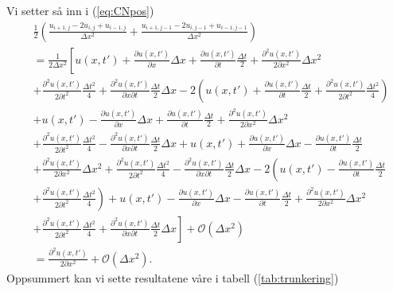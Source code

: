 \documentclass[norsk, 10pt]{article}
\begin{document}
Vi setter så inn i (\ref{eq:CNpos})
\begin{align*}
&\frac{1}{2}\left(\frac{u_{i+1,j}-2u_{i,j}+u_{i-1,j}}{\Delta x^2}+\frac{u_{i+1,j-1}-2u_{i,j-1}+u_{i-1,j-1}}{\Delta x^2} \right) \\
&= \frac 1{2\Delta x^2}\left[u(x,t')+\frac{\partial u(x,t')}{\partial x}\Delta x+\frac{\partial u(x,t')}{\partial t} \frac{\Delta t}{2} +\frac{\partial^2 u(x,t')}{2\partial x^2}\Delta x^2\right.\nonumber \\ 
&+\frac{\partial^2 u(x,t')}{2\partial t^2}\frac{\Delta t^2}{4} +\frac{\partial^2 u(x,t')}{\partial x\partial t}\frac{\Delta t}{2} \Delta x - 2\left(  u(x,t')+\frac{\partial u(x,t')}{\partial t}\frac{\Delta t}{2} +\frac{\partial ^2 u(x,t')}{2\partial t^2}\frac{\Delta t^2}{4} \right) \\
&+ u(x,t')-\frac{\partial u(x,t')}{\partial x}\Delta x+\frac{\partial u(x,t')}{\partial t} \frac{\Delta t}{2} +\frac{\partial^2 u(x,t')}{2\partial x^2}\Delta x^2\\  \nonumber
&+\frac{\partial^2 u(x,t')}{2\partial t^2}\frac{\Delta t^2}{4} -\frac{\partial^2 u(x,t')}{\partial x\partial t}\frac{\Delta t}{2} \Delta x + u(x,t')+\frac{\partial u(x,t')}{\partial x}\Delta x-\frac{\partial u(x,t')}{\partial t} \frac{\Delta t}{2} \\
&+\frac{\partial^2 u(x,t')}{2\partial x^2}\Delta x^2+\frac{\partial^2 u(x,t')}{2\partial t^2}\frac{\Delta t^2}{4} -\frac{\partial^2 u(x,t')}{\partial x\partial t}\frac{\Delta t}{2} \Delta x -2\left(u(x,t')-\frac{\partial u(x,t')}{\partial t}\frac{\Delta t}{2}\right.\\
&\left.+\frac{\partial ^2 u(x,t')}{2\partial t^2}\frac{\Delta t^2}{4} \right)+u(x,t')-\frac{\partial u(x,t')}{\partial x}\Delta x-\frac{\partial u(x,t')}{\partial t} \frac{\Delta t}{2} +\frac{\partial^2 u(x,t')}{2\partial x^2}\Delta x^2 \\  \nonumber
&\left.+\frac{\partial^2 u(x,t')}{2\partial t^2}\frac{\Delta t^2}{4} +\frac{\partial^2 u(x,t')}{\partial x\partial t}\frac{\Delta t}{2} \Delta x\right] + \mathcal O(\Delta x^2) \\
&= \frac{\partial^2 u(x,t')}{2\partial x^2} + \mathcal O(\Delta x^2).
\end{align*}
Oppsummert kan vi sette resultatene våre i tabell (\ref{tab:trunkering})
\end{document}
